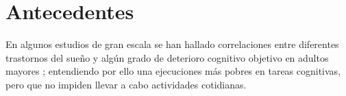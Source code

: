 




\section{Antecedentes}

En algunos estudios de gran escala se han hallado correlaciones entre diferentes trastornos del 
sueño y algún grado de deterioro cognitivo objetivo en adultos mayores 
\cite{Amer13,Miyata13,Reid06,Potvin12}; entendiendo por ello una ejecuciones más pobres en tareas
cognitivas, pero que no impiden llevar a cabo actividades cotidianas.

